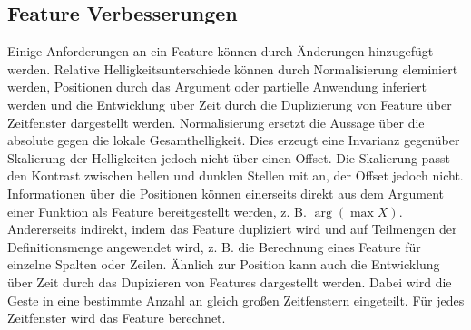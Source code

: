 \subsection{Feature Verbesserungen}
Einige Anforderungen an ein Feature können durch Änderungen hinzugefügt werden. Relative Helligkeitsunterschiede können durch Normalisierung eleminiert werden, Positionen durch das Argument oder partielle Anwendung
inferiert werden und die Entwicklung über Zeit durch die Duplizierung von Feature über Zeitfenster dargestellt werden.
\newline
\newline
Normalisierung ersetzt die Aussage über die absolute gegen die lokale Gesamthelligkeit. Dies erzeugt eine Invarianz gegenüber Skalierung der Helligkeiten jedoch nicht über einen Offset. Die Skalierung passt den
Kontrast zwischen hellen und dunklen Stellen mit an, der Offset jedoch nicht.
\newline
\newline
Informationen über die Positionen können einerseits direkt aus dem Argument einer Funktion als Feature bereitgestellt werden, z. B. $\arg(\max X)$. Andererseits indirekt, indem das Feature dupliziert wird
und auf Teilmengen der Definitionsmenge angewendet wird, z. B. die Berechnung eines Feature für einzelne Spalten oder Zeilen.
\newline
\newline
Ähnlich zur Position kann auch die Entwicklung über Zeit durch das Dupizieren von Features dargestellt werden. Dabei wird die Geste in eine bestimmte Anzahl an gleich großen Zeitfenstern eingeteilt. Für jedes
Zeitfenster wird das Feature berechnet.